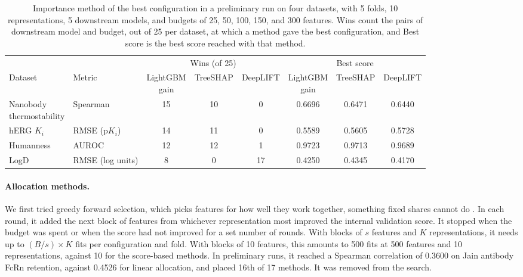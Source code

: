 \begin{table}[htbp]
\centering
\small
\begin{adjustbox}{max width=\textwidth,max totalheight=0.78\textheight}
\begin{tabular}{@{}llcccccc@{}}
\toprule
 & & \multicolumn{3}{c}{Wins (of 25)} & \multicolumn{3}{c}{Best score} \\
\cmidrule(lr){3-5}\cmidrule(lr){6-8}
Dataset & Metric & \makecell{LightGBM\\gain} & TreeSHAP & DeepLIFT & \makecell{LightGBM\\gain} & TreeSHAP & DeepLIFT \\
\midrule
\makecell[l]{Nanobody\\thermostability} & Spearman & 15 & 10 & 0 & 0.6696 & 0.6471 & 0.6440 \\
hERG $K_i$ & RMSE (p$K_i$) & 14 & 11 & 0 & 0.5589 & 0.5605 & 0.5728 \\
Humanness & AUROC & 12 & 12 & 1 & 0.9723 & 0.9713 & 0.9689 \\
LogD & RMSE (log units) & 8 & 0 & 17 & 0.4250 & 0.4345 & 0.4170 \\
\bottomrule
\end{tabular}
\end{adjustbox}
\caption[Importance method of the best configuration in a preliminary run.]{Importance method of the best configuration in a preliminary run on four datasets, with 5 folds, 10 representations, 5 downstream models, and budgets of 25, 50, 100, 150, and 300 features. Wins count the pairs of downstream model and budget, out of 25 per dataset, at which a method gave the best configuration, and Best score is the best score reached with that method.}
\label{tab:importance_wins}
\end{table}

\paragraph{Allocation methods.}
We first tried greedy forward selection, which picks features for how well they work together, something fixed shares cannot do \citep{Kohavi1997, Guyon2003}. In each round, it added the next block of features from whichever representation most improved the internal validation score. It stopped when the budget was spent or when the score had not improved for a set number of rounds. With blocks of $s$ features and $K$ representations, it needs up to $(B/s) \times K$ fits per configuration and fold. With blocks of 10 features, this amounts to 500 fits at 500 features and 10 representations, against 10 for the score-based methods. In preliminary runs, it reached a Spearman correlation of 0.3600 on Jain antibody FcRn retention, against 0.4526 for linear allocation, and placed 16th of 17 methods. It was removed from the search.


